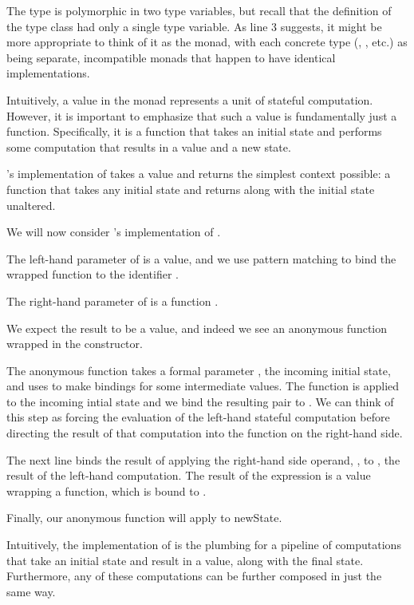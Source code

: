 The  type is polymorphic in two type variables, but recall that the definition of the  type class
had only a single type variable. As line 3 suggests, it might be more appropriate to think of it as the  monad,
with each concrete type (, , etc.) as being separate, incompatible monads that
happen to have identical implementations.

Intuitively, a value in the  monad represents a unit of stateful computation. However, it is important to
emphasize that such a value is fundamentally just a function. Specifically, it is a function that takes
an initial state and performs some computation that results in a value and a new state.

's implementation of  takes a value  and returns the simplest  context possible:
a function that takes any initial state and returns  along with the initial state unaltered.

We will now consider 's implementation of \code{(>>=)}.

The left-hand parameter of \code{(>>=)} is a  value, and we use pattern matching to bind the wrapped
function to the identifier .

The right-hand parameter of \code{(>>=)} is a function .

We expect the result to be a  value, and indeed we see an anonymous function wrapped in the 
constructor.

The anonymous function takes a formal parameter , the incoming initial state, and uses  to make bindings
for some intermediate values. The function  is applied to the incoming intial state and we bind the resulting pair
to . We can think of this step as forcing the evaluation of the left-hand stateful computation before
directing the result of that computation into the function on the right-hand side.

The next line binds the result of applying the right-hand side operand, , to , the result of the left-hand
computation. The result of the expression  is a  value wrapping a function, which is bound to .

Finally, our anonymous function will apply  to {newState}. 

Intuitively, the  implementation of \code{(>>=)} is the plumbing for a pipeline of computations that take
an initial state and result in a value, along with the final state. Furthermore, any of these  computations
can be further composed in just the same way.


